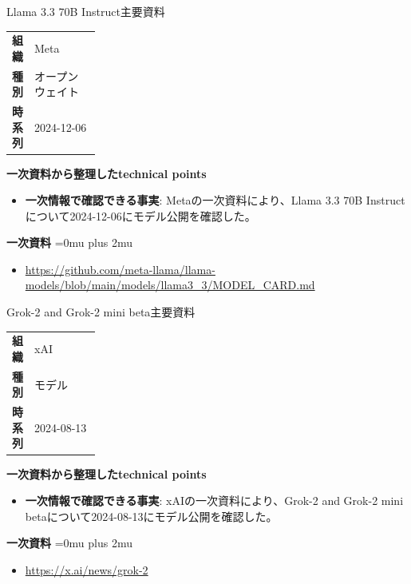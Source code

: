 \begin{technicalnote}{Llama 3.3 70B Instruct}{主要資料}
\begingroup
\begin{tabularx}{\linewidth}{@{}>{\bfseries}p{0.22\linewidth}X@{}}
組織 & Meta \\
種別 & オープンウェイト \\
時系列 & 2024-12-06 \\
\end{tabularx}
\smallskip
{\bfseries 一次資料から整理したtechnical points}
\begin{itemize}[leftmargin=1.5em,itemsep=0.35em]
\item \textbf{一次情報で確認できる事実}: Metaの一次資料により、Llama 3.3 70B Instructについて2024-12-06にモデル公開を確認した。
\end{itemize}
\begin{minipage}{\linewidth}
\begin{samepage}
{\bfseries 一次資料}
\begingroup\sloppy
\Urlmuskip=0mu plus 2mu\relax
\begin{itemize}[leftmargin=1.5em,itemsep=0.25em]
\item {\scriptsize\url{https://github.com/meta-llama/llama-models/blob/main/models/llama3_3/MODEL_CARD.md}}
\end{itemize}
\endgroup
\end{samepage}
\end{minipage}
\endgroup
\end{technicalnote}
\medskip

\begin{technicalnote}{Grok-2 and Grok-2 mini beta}{主要資料}
\begingroup
\begin{tabularx}{\linewidth}{@{}>{\bfseries}p{0.22\linewidth}X@{}}
組織 & xAI \\
種別 & モデル \\
時系列 & 2024-08-13 \\
\end{tabularx}
\smallskip
{\bfseries 一次資料から整理したtechnical points}
\begin{itemize}[leftmargin=1.5em,itemsep=0.35em]
\item \textbf{一次情報で確認できる事実}: xAIの一次資料により、Grok-2 and Grok-2 mini betaについて2024-08-13にモデル公開を確認した。
\end{itemize}
\begin{minipage}{\linewidth}
\begin{samepage}
{\bfseries 一次資料}
\begingroup\sloppy
\Urlmuskip=0mu plus 2mu\relax
\begin{itemize}[leftmargin=1.5em,itemsep=0.25em]
\item {\scriptsize\url{https://x.ai/news/grok-2}}
\end{itemize}
\endgroup
\end{samepage}
\end{minipage}
\endgroup
\end{technicalnote}
\medskip
